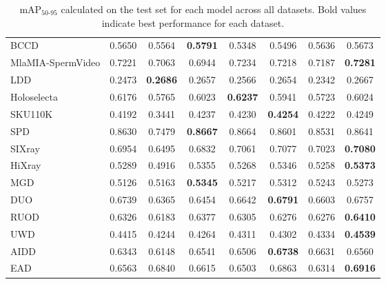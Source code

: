 \documentclass[runningheads]{llncs}
\begin{document}
\begin{table}[htbp]
\begin{tabular}{lccccccc}
\hline
BCCD & 0.5650 & 0.5564 & \textbf{0.5791} & 0.5348 & 0.5496 & 0.5636 & 0.5673 \\
MlaMIA-SpermVideo & 0.7221 & 0.7063 & 0.6944 & 0.7234 & 0.7218 & 0.7187 & \textbf{0.7281} \\
LDD& 0.2473 & \textbf{0.2686} & 0.2657 & 0.2566 & 0.2654 & 0.2342 & 0.2667 \\
\hline
Holoselecta & 0.6176 & 0.5765 & 0.6023 & \textbf{0.6237} & 0.5941 & 0.5723 & 0.6024 \\
SKU110K & 0.4192 & 0.3441 & 0.4237 & 0.4230 & \textbf{0.4254} & 0.4222 & 0.4249 \\
SPD & 0.8630 & 0.7479 & \textbf{0.8667} & 0.8664 & 0.8601 & 0.8531 & 0.8641 \\
\hline
SIXray & 0.6954 & 0.6495 & 0.6832 & 0.7061 & 0.7077& 0.7023 & \textbf{0.7080}\\
HiXray & 0.5289 & 0.4916 & 0.5355 & 0.5268 & 0.5346 & 0.5258 & \textbf{0.5373} \\
MGD & 0.5126 & 0.5163 & \textbf{0.5345} & 0.5217 & 0.5312 & 0.5243 & 0.5273 \\
\hline
DUO & 0.6739 & 0.6365 & 0.6454 & 0.6642 & \textbf{0.6791} & 0.6603 & 0.6757 \\
RUOD & 0.6326 & 0.6183 & 0.6377 & 0.6305 & 0.6276 & 0.6276 & \textbf{0.6410} \\
UWD & 0.4415 & 0.4244 & 0.4264 & 0.4311 & 0.4302 & 0.4334 & \textbf{0.4539} \\
\hline
AIDD & 0.6343 & 0.6148 & 0.6541 & 0.6506 & \textbf{0.6738} & 0.6631 & 0.6560 \\
EAD & 0.6563 & 0.6840 & 0.6615 & 0.6503 & 0.6863 & 0.6314 & \textbf{0.6916} \\
\hline
\end{tabular}
\caption{mAP$_{50\text{-}95}$ calculated on the test set for each model across all datasets. Bold values indicate best performance for each dataset.}
\label{tab:yolo_map50-95_comparison}
\end{table}
\end{document}
